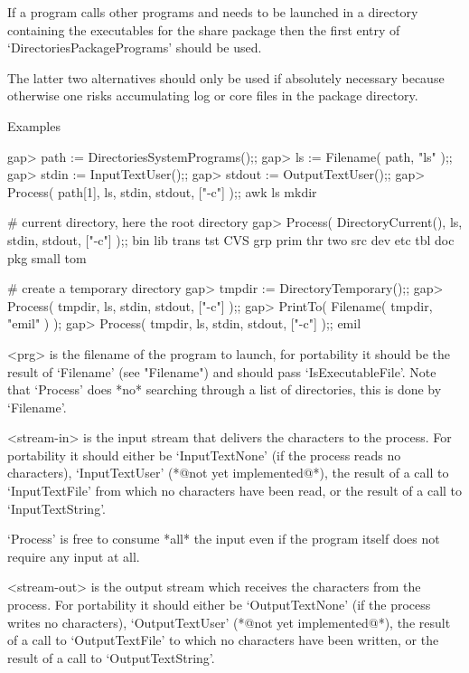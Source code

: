 If a program calls other programs and needs to be launched in a directory
containing the executables for the share package then  the first entry of
`DirectoriesPackagePrograms' should be used.

The latter  two alternatives should only  be used if absolutely necessary
because otherwise one risks accumulating log or core files in the package
directory.

Examples

\beginexample
   gap> path := DirectoriesSystemPrograms();;
   gap> ls := Filename( path, "ls" );;
   gap> stdin := InputTextUser();;
   gap> stdout := OutputTextUser();;
   gap> Process( path[1], ls, stdin, stdout, ["-c"] );;
   awk    ls     mkdir

   # current directory, here the root directory
   gap> Process( DirectoryCurrent(), ls, stdin, stdout, ["-c"] );;
   bin    lib    trans  tst    CVS    grp    prim   thr    two
   src    dev    etc    tbl    doc    pkg    small  tom

   # create a temporary directory
   gap> tmpdir := DirectoryTemporary();;                          
   gap> Process( tmpdir, ls, stdin, stdout, ["-c"] );;            
   gap> PrintTo( Filename( tmpdir, "emil" ) );
   gap> Process( tmpdir, ls, stdin, stdout, ["-c"] );;
   emil
\endexample

<prg> is the filename of the program to launch, for portability it should
be   the  result  of   `Filename'   (see   "Filename") and   should  pass
`IsExecutableFile'.  Note that  `Process'  does *no* searching through  a
list of directories, this is done by `Filename'.

<stream-in>  is the  input stream   that  delivers the characters  to the
process.   For portability it  should either  be `InputTextNone' (if  the
process reads  no characters), `InputTextUser' (*@not yet implemented@*),
the  result  of a call to `InputTextFile'  from which  no characters have
been read, or the result of a call to `InputTextString'.

`Process' is  free to consume *all* the  input even if the program itself
does not require any input at all.

<stream-out> is the output stream  which receives the characters from the
process.  For portability it should   either be `OutputTextNone' (if  the
process writes no characters), `OutputTextUser' (*@not yet implemented@*),
the result of a call to `OutputTextFile' to which no characters have been
written, or the result of a call to `OutputTextString'.

